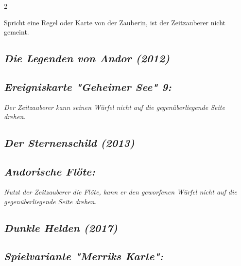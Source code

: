 \documentclass[10pt, a4paper, oneside]{book}
\newcommand{\fan}[1]{\textit{#1}}
\begin{document}
\begin{multicols*}{2}
\begin{nobgcolor}
Spricht eine Regel oder Karte von der \hyperref[zauberin]{Zauberin}, ist der Zeitzauberer nicht gemeint.

\end{nobgcolor}



\begin{bgcolor}

\section{\fan{Die Legenden von Andor (2012)}}

\subsection{\fan{Ereigniskarte "Geheimer See" 9:}}

\fan{Der Zeitzauberer kann seinen Würfel nicht auf die gegenüberliegende Seite drehen.}


\end{bgcolor}





\begin{bgcolor}
\section{\fan{Der Sternenschild (2013)}}


\subsection{\fan{Andorische Flöte:}}

\fan{Nutzt der Zeitzauberer die Flöte, kann er den geworfenen Würfel nicht auf die gegenüberliegende Seite drehen.}

\end{bgcolor}




\begin{nobgcolor}

\section{\fan{Dunkle Helden (2017)}}

\subsection{\fan{Spielvariante "Merriks Karte":}}


\end{nobgcolor}
\end{multicols*}
\end{document}
